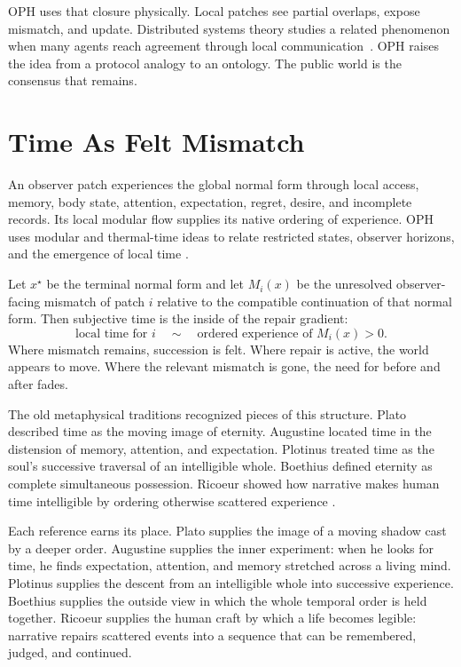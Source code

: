 \documentclass[11pt]{article}
\theoremstyle{remark}
\theoremstyle{plain}
\begin{document}
OPH uses that closure physically. Local patches see partial overlaps, expose
mismatch, and update. Distributed systems theory
studies a related phenomenon when many agents reach agreement through local
communication~\cite{Olfati2007,Lamport1982}. OPH raises the idea from a
protocol analogy to an ontology. The public world is the consensus that remains.

\section{Time As Felt Mismatch}

An observer patch experiences the global normal form through local access,
memory, body state, attention, expectation, regret, desire, and incomplete
records. Its local modular flow supplies its native ordering of experience.
OPH uses modular and thermal-time ideas to relate restricted states,
observer horizons, and the emergence of local time
\cite{OPHObservers,ConnesRovelli1994,PageWootters1983}.

Let \(x^\star\) be the terminal normal form and let \(M_i(x)\) be the unresolved
observer-facing mismatch of patch \(i\) relative to the compatible continuation
of that normal form. Then subjective time is the inside of the repair gradient:
\[
\boxed{
\text{local time for }i \quad\sim\quad \text{ordered experience of } M_i(x)>0 .
}
\]
Where mismatch remains, succession is felt. Where repair is active, the world
appears to move. Where the relevant mismatch is gone, the need for before and
after fades.

The old metaphysical traditions recognized pieces of this structure. Plato
described time as the moving image of eternity. Augustine located time in the
distension of memory, attention, and expectation. Plotinus treated time as the
soul's successive traversal of an intelligible whole. Boethius defined eternity
as complete simultaneous possession. Ricoeur showed how narrative makes human
time intelligible by ordering otherwise scattered experience
\cite{PlatoTimaeus,AugustineConfessions,PlotinusEnneads,BoethiusConsolation,Ricoeur1984}.

Each reference earns its place. Plato supplies the image of a moving
shadow cast by a deeper order. Augustine supplies the inner experiment: when he
looks for time, he finds expectation, attention, and memory stretched across a
living mind. Plotinus supplies the descent from an intelligible whole into
successive experience. Boethius supplies the outside view in which the whole
temporal order is held together. Ricoeur supplies the human craft by which a
life becomes legible: narrative repairs scattered events into a sequence that
can be remembered, judged, and continued.
\end{document}
